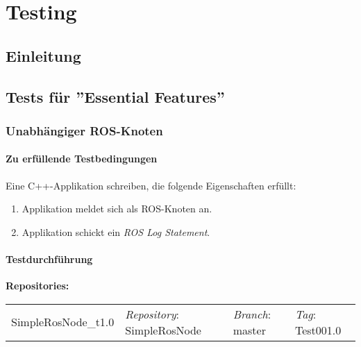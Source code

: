 \chapter{Testing}
\section{Einleitung}

\section{Tests für ''Essential Features''}
\subsection{Unabhängiger ROS-Knoten}
\subsubsection{Zu erfüllende Testbedingungen}
Eine C++-Applikation schreiben, die folgende Eigenschaften erfüllt:
\begin{enumerate}
\item Applikation meldet sich als ROS-Knoten an.
\item Applikation schickt ein \textit{ROS Log Statement}.
\end{enumerate}

\subsubsection{Testdurchführung}
\textbf{Repositories:} \\
\begin{tabular}
  { l						| l			 							l								 l								}
  SimpleRosNode\_t1.0		& \textit{Repository}: SimpleRosNode	& \textit{Branch}: master		& \textit{Tag}: Test001.0 		\\
\end{tabular}


